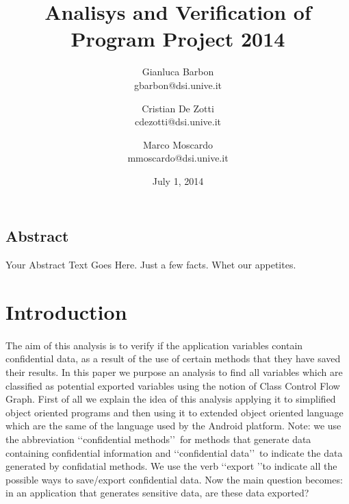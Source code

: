 \documentclass[letterpaper,twocolumn,10pt]{article}
\begin{document}
\title{\Large \bf Analisys and Verification of Program Project 2014}

\author{
{\rm Gianluca Barbon}\\
gbarbon@dsi.unive.it
\and
{\rm Cristian De Zotti}\\
cdezotti@dsi.unive.it
\and
{\rm Marco Moscardo}\\
mmoscardo@dsi.unive.it
}
\date{July 1, 2014}
\maketitle

\thispagestyle{empty}


\subsection*{Abstract}
Your Abstract Text Goes Here.  Just a few facts.
Whet our appetites.



\section{Introduction}
\paragraph{}
The aim of this analysis is to verify if the application variables contain confidential data, as a result of the use of certain methods that they have saved their results.  
In this paper we purpose an analysis to find all variables which are classified as potential exported variables using the notion of Class Control Flow Graph.
First of all we explain the idea of this analysis applying it to simplified object oriented programs and then using it to extended object oriented language which are the same of the language used by the Android platform.
Note: we use the abbreviation \lq\lq confidential methods\rq\rq\ for methods that generate data containing confidential information and \lq\lq confidential data\rq\rq\ to indicate the data generated by confidatial methods. We use the verb \lq\lq export \rq\rq to indicate all the possible ways to save/export confidential data.
Now the main question becomes: in an application that generates sensitive data, are these data exported?
\end{document}
